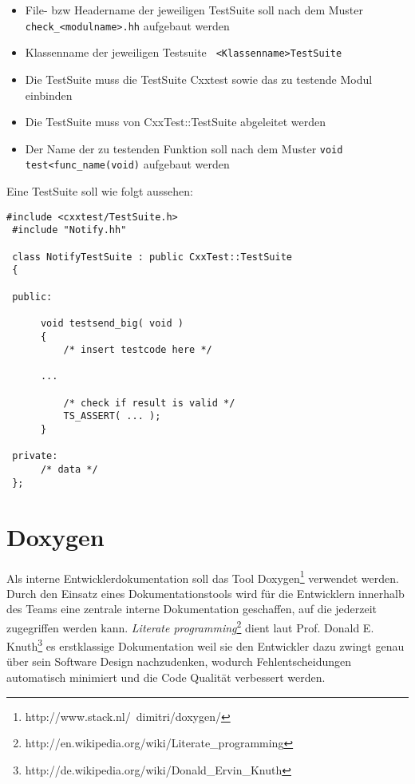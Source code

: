 \begin{itemize}
	\item File- bzw Headername der jeweiligen TestSuite soll nach dem Muster \verb+check_<modulname>.hh+ aufgebaut werden
	\item Klassenname der jeweiligen Testsuite \verb+ <Klassenname>TestSuite+
	\item Die TestSuite muss die TestSuite Cxxtest sowie das zu testende Modul einbinden
	\item Die TestSuite muss von CxxTest::TestSuite abgeleitet werden 
	\item Der Name der zu testenden Funktion soll nach dem Muster \verb+void test<func_name(void)+ aufgebaut werden
\end{itemize}  


Eine TestSuite soll wie folgt aussehen:


\begin{lstlisting}[caption={TestSuite Template check\_notify.hh Beispielcodefragment für die Klasse ,,Notify''},label={lst:cxxtemp}]
 #include <cxxtest/TestSuite.h>
 #include "Notify.hh"
 
 class NotifyTestSuite : public CxxTest::TestSuite
 {
  
 public:
  
      void testsend_big( void )
      {
          /* insert testcode here */
 	  
 	  ...
 	   
          /* check if result is valid */    
          TS_ASSERT( ... );
      }
   
 private:
      /* data */
 };
\end{lstlisting}


\section{Doxygen}
Als interne Entwicklerdokumentation soll das Tool Doxygen\footnote{http://www.stack.nl/~dimitri/doxygen/} verwendet werden.
Durch den Einsatz eines Dokumentationstools wird für die Entwicklern innerhalb des Teams eine zentrale interne Dokumentation geschaffen,
auf die jederzeit zugegriffen werden kann. 
\emph{Literate programming}\footnote{http://en.wikipedia.org/wiki/Literate\_programming} dient laut Prof. Donald E. Knuth\footnote{http://de.wikipedia.org/wiki/Donald\_Ervin\_Knuth} 
es erstklassige Dokumentation weil sie den Entwickler dazu zwingt genau über sein Software Design nachzudenken, wodurch
Fehlentscheidungen automatisch minimiert und die Code Qualität verbessert werden.
